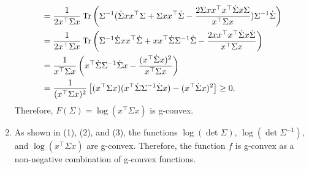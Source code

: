 \documentclass[en, oneside]{assignment}
\begin{document}
\begin{sol}
\begin{enumerate}[label=(\arabic*)]
\begin{align*}
            &= \frac{1}{2 x^\top \Sigma x} \operatorname{Tr} \left(\Sigma^{-1} (\dot \Sigma x x^\top \Sigma + \Sigma x x^\top \dot \Sigma 
            - \frac{2 \Sigma x x^\top x^\top \dot \Sigma x \Sigma}{x^\top \Sigma x}) \Sigma^{-1} \dot \Sigma\right) \\
            &= \frac{1}{2 x^\top \Sigma x} \operatorname{Tr} \left( \Sigma^{-1} \dot \Sigma x x^\top \dot \Sigma + x x^\top \dot \Sigma \Sigma^{-1} \dot \Sigma 
            - \frac{2 x x^\top x^\top \dot \Sigma x \dot \Sigma}{x^\top \Sigma x} \right) \\
            &= \frac{1}{x^\top \Sigma x} \left( x^\top \dot \Sigma \Sigma^{-1} \dot \Sigma x
            - \frac{(x^\top \dot \Sigma x)^2}{x^\top \Sigma x} \right) \\
            &= \frac{1}{(x^\top \Sigma x)^2} \left[ (x^\top \Sigma x) (x^\top \dot \Sigma \Sigma^{-1} \dot \Sigma x) - (x^\top \dot \Sigma x)^2 \right] \geq 0.
        \end{align*}
        Therefore, $F(\Sigma) = \log (x^\top \Sigma x)$ is g-convex.
        \item As shown in (1), (2), and (3), the functions $\log (\det \Sigma)$, $\log (\det \Sigma^{-1})$, and $\log (x^\top \Sigma x)$ are g-convex.
        Therefore, the function $f$ is g-convex as a non-negative combination of g-convex functions.
    \end{enumerate}
\end{sol}
\end{document}
